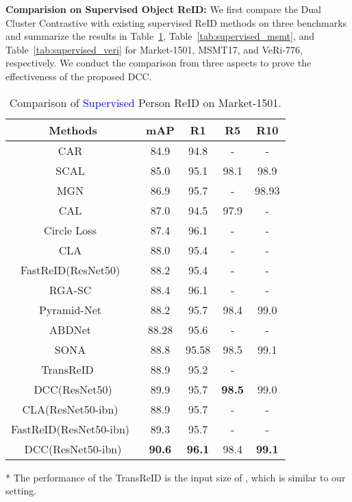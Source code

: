 \documentclass[10pt,twocolumn,letterpaper]{article}
\begin{document}
\textbf{Comparision on Supervised Object ReID:}
We first compare the Dual Cluster Contrastive with existing supervised ReID methods on three benchmarks and summarize the results in Table~\ref{tab:supervised_market}, Table~\ref{tab:supervised_msmt}, and Table~\ref{tab:supervised_veri} for Market-1501, MSMT17, and VeRi-776, respectively.
We conduct the comparison from three aspects to prove the effectiveness of the proposed DCC.

\begin{table}
\footnotesize
\begin{center}
\begin{threeparttable}
\begin{tabular}{c|cccc}
\toprule
Methods           & mAP& R1 & R5 & R10\\
\midrule
CAR~\cite{zhou2019omni} & 84.9&94.8&-&-\\
SCAL~\cite{chen2019mixed} & 85.0&95.1&98.1&98.9\\
MGN~\cite{wang2018learning} & 86.9 & 95.7 &-& 98.93\\
CAL~\cite{DBLP:journals/corr/abs-2108-08728} & 87.0 & 94.5 & 97.9 & -\\
Circle Loss~\cite{sun2020circle} & 87.4&96.1&-&-\\
CLA~\cite{DBLP:journals/corr/abs-2008-06810} &88.0&95.4&-&-\\
FastReID(ResNet50)~\cite{he2020fastreid}& 88.2&95.4&-&-\\
RGA-SC~\cite{DBLP:conf/cvpr/ZhangLZJ020} & 88.4 & 96.1 & -&- \\
Pyramid-Net~\cite{zheng2019pyramidal} & 88.2 & 95.7 & 98.4 & 99.0  \\
ABDNet~\cite{chen2019abd} & 88.28&95.6&-&-\\
SONA~\cite{xia2019second}& 88.8& 95.58&98.5&99.1\\
TransReID~\cite{He_2021_ICCV}~\tnote{*} & 88.9&95.2&-\\
DCC(ResNet50) &89.9&95.7&\textbf{98.5}&99.0\\
\midrule
CLA(ResNet50-ibn)~\cite{DBLP:journals/corr/abs-2008-06810} &88.9&95.7&-&-\\
FastReID(ResNet50-ibn)~\cite{he2020fastreid}& 89.3& 95.7&-&-\\
DCC(ResNet50-ibn) &\textbf{90.6}&\textbf{96.1}&98.4&\textbf{99.1}\\
\bottomrule
\end{tabular}
\begin{tablenotes}
\item[*] The performance of the TransReID is the input size of , which is similar to our setting.
\end{tablenotes}
\end{threeparttable}
\caption{\small Comparison of \textcolor{blue}{Supervised} Person ReID on Market-1501.}
\label{tab:supervised_market}
\end{center}
\end{table}
\end{document}
